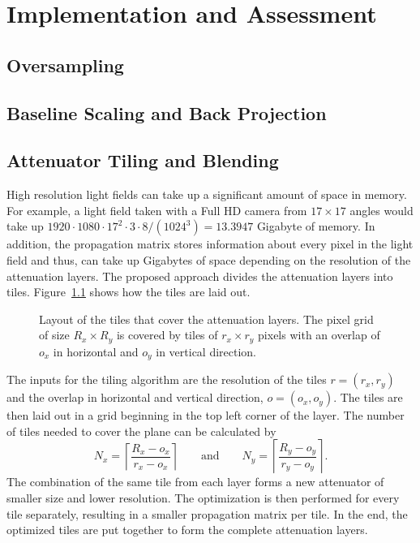\chapter{Implementation and Assessment}
\label{chp:Implementation_and_Assessment}

\section{Oversampling}

\section{Baseline Scaling and Back Projection}

\section{Attenuator Tiling and Blending}

High resolution light fields can take up a significant amount of space in memory. 
For example, a light field taken with a Full HD camera from $17 \times 17$ angles would take up $1920 \cdot 1080 \cdot 17^2 \cdot 3 \cdot 8 / (1024^3) = 13.3947$ Gigabyte of memory. 
In addition, the propagation matrix stores information about every pixel in the light field and thus, can take up Gigabytes of space depending on the resolution of the attenuation layers. 
The proposed approach divides the attenuation layers into tiles. 
Figure~\ref{fig:tiling_layout} shows how the tiles are laid out.
\begin{figure}[tb]
	
	\caption[Tiling layout]
	{Layout of the tiles that cover the attenuation layers.
		The pixel grid of size $R_x \times R_y$ is covered by tiles of $r_x \times r_y$ pixels with an overlap of $o_x$ in horizontal and $o_y$ in vertical direction.}
	\label{fig:tiling_layout}
\end{figure} 
The inputs for the tiling algorithm are the resolution of the tiles $r = (r_x, r_y)$ and the overlap in horizontal and vertical direction, $o = (o_x, o_y)$. 
The tiles are then laid out in a grid beginning in the top left corner of the layer. 
The number of tiles needed to cover the plane can be calculated by 
\begin{equation}
	N_x = \left \lceil \dfrac{R_x - o_x}{r_x - o_x} \right \rceil
	\qquad 
	\text{and} 
	\qquad
	N_y = \left \lceil \dfrac{R_y - o_y}{r_y - o_y} \right \rceil.
\end{equation}
The combination of the same tile from each layer forms a new attenuator of smaller size and lower resolution. 
The optimization is then performed for every tile separately, resulting in a smaller propagation matrix per tile. 
In the end, the optimized tiles are put together to form the complete attenuation layers. 

